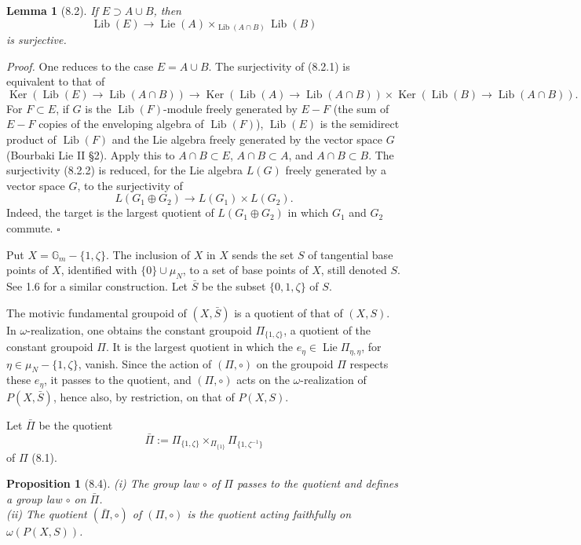 \documentclass[10pt,a4paper]{article}
\newcommand{\Gm}{\mathbb G_m}
\newcommand{\Ker}{\operatorname{Ker}}
\newcommand{\Lie}{\operatorname{Lie}}
\newcommand{\Lib}{\operatorname{Lib}}
\theoremstyle{deligne}
\newtheorem*{proposition*}{Proposition}
\newtheorem*{lemma*}{Lemma}
\newenvironment{proofdel}{\textit{Proof.}}{\hfill$\square$}
\newcommand{\heading}[1]{\vspace{0.65em}\noindent{\bfseries #1}\quad}
\begin{document}
\begin{lemma*}[8.2]
If \(E\supset A\cup B\), then
\[
\tag{8.2.1}
\Lib(E)\longrightarrow \Lie(A)\times_{\Lib(A\cap B)}\Lib(B)
\]
is surjective.
\end{lemma*}

\begin{proofdel}
One reduces to the case \(E=A\cup B\). The surjectivity of (8.2.1) is equivalent to that of
\[
\tag{8.2.2}
\Ker(\Lib(E)\to\Lib(A\cap B))
\longrightarrow
\Ker(\Lib(A)\to\Lib(A\cap B))\times
\Ker(\Lib(B)\to\Lib(A\cap B)).
\]
For \(F\subset E\), if \(G\) is the \(\Lib(F)\)-module freely generated by \(E-F\) (the sum of \(E-F\) copies of the enveloping algebra of \(\Lib(F)\)), \(\Lib(E)\) is the semidirect product of \(\Lib(F)\) and the Lie algebra freely generated by the vector space \(G\) (Bourbaki Lie II \S2). Apply this to \(A\cap B\subset E\), \(A\cap B\subset A\), and \(A\cap B\subset B\). The surjectivity (8.2.2) is reduced, for the Lie algebra \(L(G)\) freely generated by a vector space \(G\), to the surjectivity of
\[
L(G_1\oplus G_2)\longrightarrow L(G_1)\times L(G_2).
\]
Indeed, the target is the largest quotient of \(L(G_1\oplus G_2)\) in which \(G_1\) and \(G_2\) commute.
\end{proofdel}

\heading{8.3.} Put \(X=\Gm-\{1,\zeta\}\). The inclusion of \(X\) in \(X\) sends the set \(S\) of tangential base points of \(X\), identified with \(\{0\}\cup\mu_N\), to a set of base points of \(X\), still denoted \(S\). See 1.6 for a similar construction. Let \(\bar S\) be the subset \(\{0,1,\zeta\}\) of \(S\).

The motivic fundamental groupoid of \((X,\bar S)\) is a quotient of that of \((X,S)\). In \(\omega\)-realization, one obtains the constant groupoid \(\Pi_{\{1,\zeta\}}\), a quotient of the constant groupoid \(\Pi\). It is the largest quotient in which the \(e_\eta\in\Lie\Pi_{\eta,\eta}\), for \(\eta\in\mu_N-\{1,\zeta\}\), vanish. Since the action of \((\Pi,\circ)\) on the groupoid \(\Pi\) respects these \(e_\eta\), it passes to the quotient, and \((\Pi,\circ)\) acts on the \(\omega\)-realization of \(P(X,\bar S)\), hence also, by restriction, on that of \(P(X,S)\).

Let \(\bar\Pi\) be the quotient
\[
\bar\Pi:=\Pi_{\{1,\zeta\}}\times_{\Pi_{\{1\}}}\Pi_{\{1,\zeta^{-1}\}}
\]
of \(\Pi\) (8.1).

\begin{proposition*}[8.4]
(i) The group law \(\circ\) of \(\Pi\) passes to the quotient and defines a group law \(\circ\) on \(\bar\Pi\).\\
(ii) The quotient \((\bar\Pi,\circ)\) of \((\Pi,\circ)\) is the quotient acting faithfully on \(\omega(P(X,S))\).
\end{proposition*}
\end{document}
